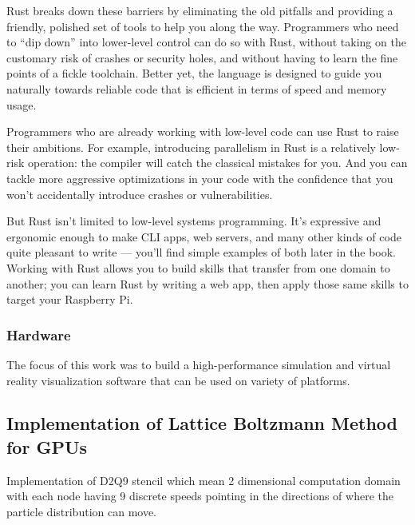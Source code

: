 Rust breaks down these barriers by eliminating the old pitfalls and providing a friendly, polished set of tools to help you along the way. Programmers who need to “dip down” into lower-level control can do so with Rust, without taking on the customary risk of crashes or security holes, and without having to learn the fine points of a fickle toolchain. Better yet, the language is designed to guide you naturally towards reliable code that is efficient in terms of speed and memory usage.

Programmers who are already working with low-level code can use Rust to raise their ambitions. For example, introducing parallelism in Rust is a relatively low-risk operation: the compiler will catch the classical mistakes for you. And you can tackle more aggressive optimizations in your code with the confidence that you won’t accidentally introduce crashes or vulnerabilities.

But Rust isn’t limited to low-level systems programming. It’s expressive and ergonomic enough to make CLI apps, web servers, and many other kinds of code quite pleasant to write — you’ll find simple examples of both later in the book. Working with Rust allows you to build skills that transfer from one domain to another; you can learn Rust by writing a web app, then apply those same skills to target your Raspberry Pi.


\cite{steveklabnik2018}


\subsubsection{Hardware}

The focus of this work was to build a high-performance simulation and virtual reality visualization software that can be used on variety of platforms. 


\subsection{Implementation of Lattice Boltzmann Method for GPUs}

Implementation of D2Q9 stencil which mean 2 dimensional computation domain with each node having 9 discrete speeds pointing in the directions of where the particle distribution can move.

